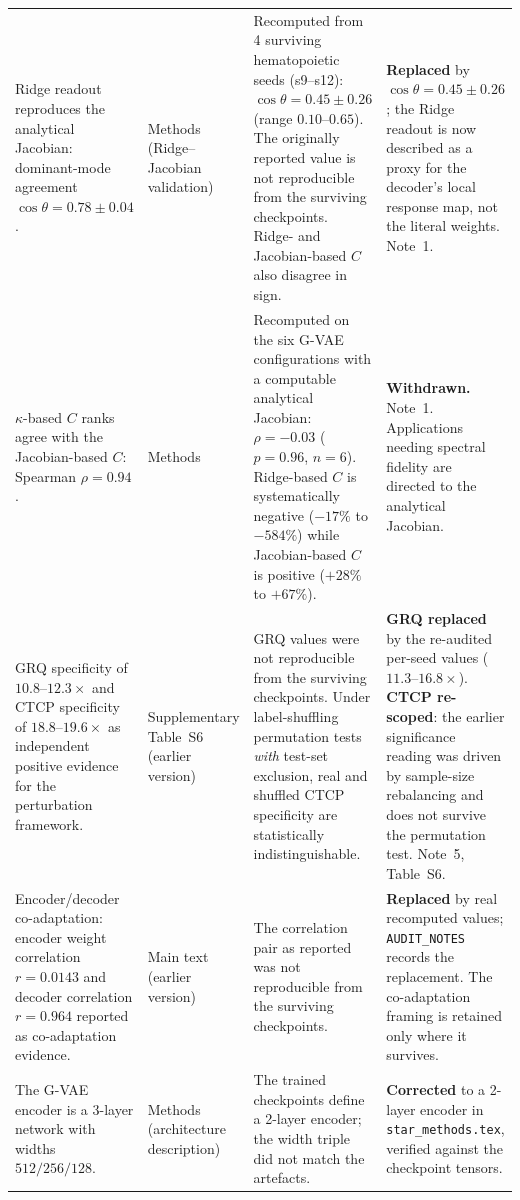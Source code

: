 \documentclass[11pt,a4paper]{article}
\begin{document}
\begin{tabular}{@{}p{} p{} p{} p{}@{}}
Ridge readout reproduces the analytical Jacobian: dominant-mode agreement
$\cos\theta=0.78\pm0.04$.
&
Methods (Ridge--Jacobian validation)
&
Recomputed from 4 surviving hematopoietic seeds (s9--s12): $\cos\theta=0.45\pm0.26$
(range $0.10$--$0.65$). The originally reported value is not reproducible from the surviving
checkpoints. Ridge- and Jacobian-based $C$ also disagree in sign.
&
\textbf{Replaced} by $\cos\theta=0.45\pm0.26$; the Ridge readout is now described as a proxy for
the decoder's local response map, not the literal weights. Note~1. \\

$\kappa$-based $C$ ranks agree with the Jacobian-based $C$: Spearman $\rho=0.94$.
&
Methods
&
Recomputed on the six G-VAE configurations with a computable analytical Jacobian:
$\rho=-0.03$ ($p=0.96$, $n=6$). Ridge-based $C$ is systematically negative
($-17\%$ to $-584\%$) while Jacobian-based $C$ is positive ($+28\%$ to $+67\%$).
&
\textbf{Withdrawn.} Note~1. Applications needing spectral fidelity are directed to the analytical
Jacobian. \\

GRQ specificity of $10.8$--$12.3\times$ and CTCP specificity of $18.8$--$19.6\times$ as
independent positive evidence for the perturbation framework.
&
Supplementary Table~S6 (earlier version)
&
GRQ values were not reproducible from the surviving checkpoints. Under label-shuffling permutation
tests \emph{with} test-set exclusion, real and shuffled CTCP specificity are statistically
indistinguishable.
&
\textbf{GRQ replaced} by the re-audited per-seed values ($11.3$--$16.8\times$). \textbf{CTCP
re-scoped}: the earlier significance reading was driven by sample-size rebalancing and does not
survive the permutation test. Note~5, Table~S6. \\

Encoder/decoder co-adaptation: encoder weight correlation $r=0.0143$ and decoder correlation
$r=0.964$ reported as co-adaptation evidence.
&
Main text (earlier version)
&
The correlation pair as reported was not reproducible from the surviving checkpoints.
&
\textbf{Replaced} by real recomputed values; \texttt{AUDIT\_NOTES} records the replacement. The
co-adaptation framing is retained only where it survives. \\

The G-VAE encoder is a 3-layer network with widths $512/256/128$.
&
Methods (architecture description)
&
The trained checkpoints define a 2-layer encoder; the width triple did not match the artefacts.
&
\textbf{Corrected} to a 2-layer encoder in \texttt{star\_methods.tex}, verified against the
checkpoint tensors. \\


\end{tabular}
\end{document}
